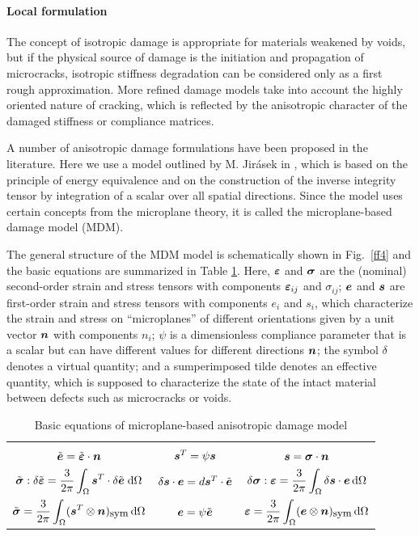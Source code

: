 \documentclass[a4paper]{article}
\newcommand{\mbf}[1]{\mbox{\boldmath$#1$}}
\newcommand{\eps} {\mbf{\varepsilon}}
\newcommand{\ve}{\mbf{e}}%
\newcommand{\vet}{\tilde{\ve}}
\newcommand{\veps}{\mbf{\varepsilon}}  %
\newcommand{\vsig}{\mbf{\sigma}}%
\newcommand{\vs}{\mbf{s}}%
\newcommand{\vepst}{\tilde{\veps}}
\newcommand{\vst}{\mbf{s}^T}%
\newcommand{\vsigt}{\tilde{\vsig}}
\newcommand{\dvepst}{\delta\tilde{\veps}}
\newcommand{\dvet}{\delta\vet}
\newcommand{\dvs}{\delta\vs}
\newcommand{\dvsig}{\delta\vsig}
\newcommand{\dO}{\,\mbox{d}\Omega}
\newcommand{\sym}{_{\mbox{\small sym}}}
\begin{document}
\paragraph{Local formulation}

The concept of isotropic damage is appropriate for materials weakened
by voids, but if the physical source of damage is the initiation and
propagation of microcracks, isotropic stiffness degradation
can be considered only as a first rough
approximation. More refined damage models take into account the highly
oriented nature of cracking, which is reflected by the anisotropic
character of the damaged stiffness or compliance matrices.

A number of anisotropic damage formulations have been proposed
in the literature. Here we use a model outlined by M. Jir\'{a}sek
in \cite{mdm}, which is based on the principle of energy
equivalence and on the construction of the inverse integrity
tensor by integration of a scalar over all spatial directions.
Since the model uses certain concepts from the
microplane theory, it is called the microplane-based damage model (MDM).

The general structure of the MDM
model is schematically shown in Fig.\ \ref{ff4}
and the basic equations are summarized in Table \ref{tab2}.
Here, $\veps$ and $\vsig$ are the (nominal) second-order
strain and stress tensors
with components $\eps_{ij}$ and $\sigma_{ij}$; $\ve$ and $\vs$
are first-order strain and stress tensors with components $e_i$
and $s_i$, which characterize the strain and stress on ``microplanes''
of different orientations given by a unit vector $\mbf{n}$
with components $n_i$;
$\psi$ is a dimensionless compliance parameter
that is a scalar but can have different values for different
directions $\mbf{n}$;
the symbol $\delta$ denotes a virtual quantity; and a sumperimposed
tilde denotes an effective quantity, which is supposed to characterize the
state of the intact material between defects such as microcracks or voids.

\begin{table}[!htb]
\caption{Basic equations of microplane-based anisotropic damage model}
\label{tab2}
\begin{center}
\begin{tabular}{|c|c|c|}
\hline
&&\\
$\vet=\vepst\cdot\mbf{n}$
&
$\vst = \psi\vs$
&
$\vs=\vsig\cdot\mbf{n}$
\\[5mm]
$\vsigt:\dvepst = \displaystyle\frac{3}{2\pi} \int_{\Omega}\vst\cdot\dvet\;\mbox{d}\Omega$
&
$\dvs\cdot\ve=d\vst\cdot\vet$
&
$\dvsig:\veps = \displaystyle\frac{3}{2\pi} \int_{\Omega}\dvs\cdot\ve\dO$
\\[5mm]
$\vsigt = \displaystyle\frac{3}{2\pi}\int_\Omega (\vst\otimes\mbf{n})\sym\dO$
&
$\ve=\psi\vet$
&
$\veps = \displaystyle\frac{3}{2\pi}\int_\Omega (\ve\otimes\mbf{n})\sym\dO$
\\[5mm]
\hline
\end{tabular}
\end{center}
\end{table}
\end{document}
